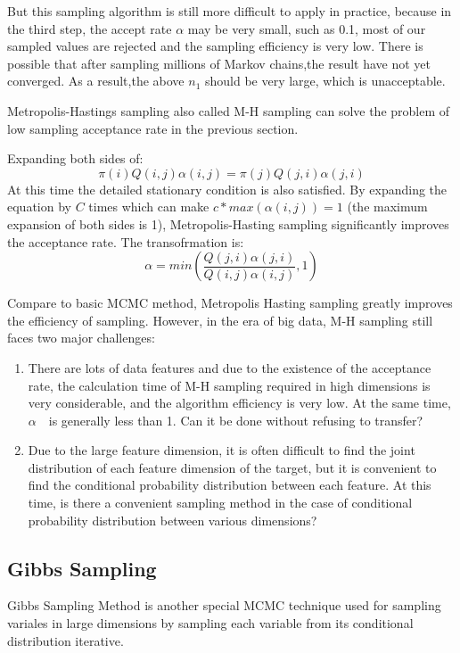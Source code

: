 But this sampling algorithm is still more difficult to apply in practice, because in the third step, the accept rate $\alpha$ may be very small, such as 0.1, most of our sampled values ​​are rejected and the sampling efficiency is very low. There is possible that after sampling millions of Markov chains,the result have not yet converged. As a result,the above $n_1$ should be  very large, which is unacceptable.

Metropolis-Hastings sampling also called M-H sampling can solve the problem of low sampling acceptance rate in the previous section.

Expanding both sides of:
\[
  \pi(i)Q(i,j)\alpha(i,j) =  \pi(j)Q(j,i)\alpha(j,i)
\]
At this time the detailed stationary condition is also satisfied. By expanding the equation by $C$ times which can make $c* max(\alpha(i,j)) = 1$ (the maximum expansion of both sides is 1), Metropolis-Hasting sampling significantly improves the acceptance rate.
The transofrmation is:
\[
  \alpha = min(\frac{Q(j,i)\alpha(j,i)}{Q(i,j)\alpha(i,j)},1)
\]

Compare to basic MCMC method, Metropolis Hasting sampling  greatly improves the efficiency of sampling. However, in the era of big data, M-H sampling still faces two major challenges:
\begin{enumerate}

  \item  There are lots of data features and due to the existence of the acceptance rate, the calculation time of M-H sampling required in high dimensions is very considerable, and the algorithm efficiency is very low. At the same time, $ \alpha $　is generally less than 1.  Can it be done without refusing to transfer?

  \item Due to the large feature dimension, it is often difficult to find the joint distribution of each feature dimension of the target, but it is convenient to find the conditional probability distribution between each feature. At this time, is there a  convenient sampling  method in the case of conditional probability distribution between various dimensions?
\end{enumerate}

\subsection{Gibbs Sampling}
Gibbs Sampling Method\cite{bda} is another special MCMC technique used for sampling variales in large dimensions by sampling each variable from its conditional distribution iterative.

